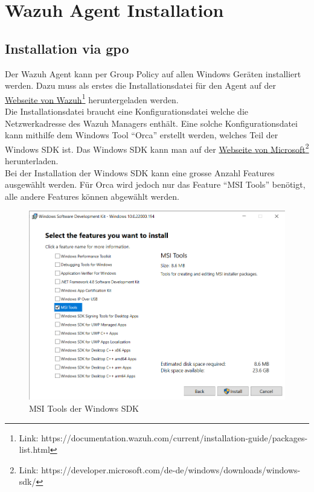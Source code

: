 \chapter{Wazuh Agent Installation}

\section{Installation via \acrshort{gpo}}
Der Wazuh Agent kann per Group Policy auf allen Windows Geräten installiert werden.
Dazu muss als erstes die Installationsdatei für den Agent auf der \href{https://documentation.wazuh.com/current/installation-guide/packages-list.html}{Webseite von Wazuh}\footnote{Link: https://documentation.wazuh.com/current/installation-guide/packages-list.html} heruntergeladen werden.\\

Die Installationsdatei braucht eine Konfigurationsdatei welche die Netzwerkadresse des Wazuh Managers enthält.
Eine solche Konfigurationsdatei kann mithilfe dem Windows Tool ``Orca'' erstellt werden, welches Teil der Windows SDK ist. Das Windows SDK kann man auf der \href{https://developer.microsoft.com/de-de/windows/downloads/windows-sdk/}{Webseite von Microsoft}\footnote{Link: https://developer.microsoft.com/de-de/windows/downloads/windows-sdk/} herunterladen.\\

Bei der Installation der Windows SDK kann eine grosse Anzahl Features ausgewählt werden.
Für Orca wird jedoch nur das Feature ``MSI Tools'' benötigt, alle andere Features können abgewählt werden.
\begin{figure}[H]
    \centering
    \includegraphics[width=\linewidth]{../img/agent/install-sdk.png}
    \caption{MSI Tools der Windows SDK}
\end{figure}

